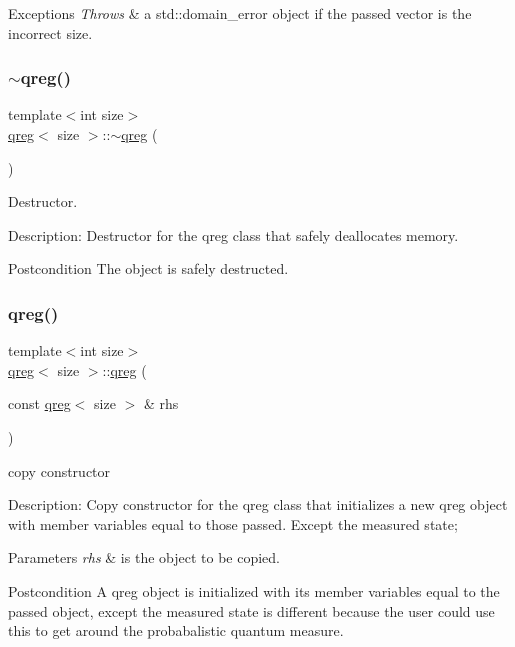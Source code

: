 \begin{DoxyExceptions}{Exceptions}
{\em Throws} & a std\+::domain\+\_\+error object if the passed vector is the incorrect size. \\
\hline
\end{DoxyExceptions}
\mbox{\label{classqreg_a61323454f297a9bb149febf889d54914}} 
\subsubsection{\texorpdfstring{$\sim$qreg()}{~qreg()}}
{\footnotesize\ttfamily template$<$int size$>$ \\
\hyperlink{classqreg}{qreg}$<$ size $>$\+::$\sim$\hyperlink{classqreg}{qreg} (\begin{DoxyParamCaption}{ }\end{DoxyParamCaption})}



Destructor. 

Description\+: Destructor for the qreg class that safely deallocates memory. \begin{DoxyPostcond}{Postcondition}
The object is safely destructed. 
\end{DoxyPostcond}
\mbox{\label{classqreg_afbb6aeb20d3e963cebd5d8063221b872}} 
\subsubsection{\texorpdfstring{qreg()}{qreg()}\hspace{0.1cm}{\footnotesize\ttfamily [3/3]}}
{\footnotesize\ttfamily template$<$int size$>$ \\
\hyperlink{classqreg}{qreg}$<$ size $>$\+::\hyperlink{classqreg}{qreg} (\begin{DoxyParamCaption}\item[{const \hyperlink{classqreg}{qreg}$<$ size $>$ \&}]{rhs }\end{DoxyParamCaption})}



copy constructor 

Description\+: Copy constructor for the qreg class that initializes a new qreg object with member variables equal to those passed. Except the measured state; 
\begin{DoxyParams}{Parameters}
{\em rhs} & is the object to be copied. \\
\hline
\end{DoxyParams}
\begin{DoxyPostcond}{Postcondition}
A qreg object is initialized with its member variables equal to the passed object, except the measured state is different because the user could use this to get around the probabalistic quantum measure. 
\end{DoxyPostcond}


